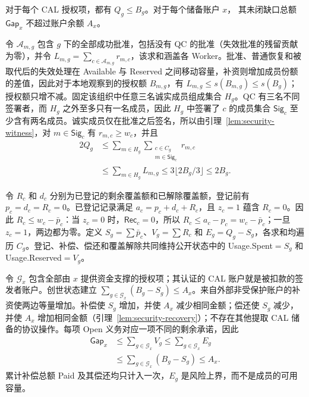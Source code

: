 \begin{theorem}[潜在责任具有资金覆盖]
\label{thm:security-coverage}
对于每个 CAL 授权项，都有 $Q_g\le B_g$。对于每个储备账户 $x$，
其未闭缺口总额 $\mathsf{Gap}_x$ 不超过账户余额 $A_x$。
\end{theorem}
\begin{IEEEproof}
令 $\mathcal A_{m,g}$ 包含 $g$ 下的全部成功批准，包括没有 QC 的批准（失效批准的残留贡献为零），并令 $L_{m,g}=\sum_{c\in\mathcal A_{m,g}}r_{m,c}$，该求和涵盖各 Worker。批准、普通恢复和被取代后的失效处理在 Available 与 Reserved 之间移动容量，补资则增加成员份额的差值，因此对于本地观察到的授权额 $B_{m,g}$，有 $L_{m,g}\le s(B_{m,g})\le s(B_g)$；授权额只增不减。固定该组织中任意三名诚实成员组成集合 $H_g$。QC 有三名不同签署者，而 $H_g$ 之外至多只有一名成员，因此 $H_g$ 中签署了 $c$ 的成员集合 $\mathsf{Sig}_c$ 至少含有两名成员。诚实成员仅在批准之后签名，所以由引理~\ref{lem:security-witness}，对 $m\in\mathsf{Sig}_c$ 有 $r_{m,c}\ge w_c$，并且
\begin{equation}
\begin{aligned}
  2Q_g
  &\le\sum_{m\in H_g}\sum_{\substack{c\in C_g\\m\in\mathsf{Sig}_c}}r_{m,c}\\
  &\le\sum_{m\in H_g}L_{m,g}
  \le3\lfloor2B_g/3\rfloor\le2B_g.
\end{aligned}
\label{eq:security-counting}
\end{equation}

令 $R_c$ 和 $d_c$ 分别为已登记的剩余覆盖额和已解除覆盖额，登记前有 $p_c=d_c=R_c=0$。已登记记录满足 $a_c=p_c+d_c+R_c$，且 $z_c=1$ 蕴含 $R_c=0$。因此 $R_c\le w_c-\bar p_c$：当 $z_c=0$ 时，$\mathsf{Rec}_c=0$，所以 $R_c\le a_c-p_c=w_c-\bar p_c$；一旦 $z_c=1$，两边都为零。定义 $S_g=\sum\bar p_c$、$V_g=\sum R_c$ 和 $E_g=Q_g-S_g$，各求和均遍历 $C_g$。登记、补偿、偿还和覆盖解除共同维持公开状态中的 Usage.Spent$=S_g$ 和 Usage.Reserved$=V_g$。

令 $\mathcal G_x$ 包含全部由 $x$ 提供资金支撑的授权项；其认证的 CAL 账户就是被扣款的签发者账户。创世状态建立 $\sum_{g\in\mathcal G_x}(B_g-S_g)\le A_x$。来自外部非受保护账户的补资使两边等量增加。补偿使 $S_g$ 增加，并使 $A_x$ 减少相同金额；偿还使 $S_g$ 减少，并使 $A_x$ 增加相同金额（引理~\ref{lem:security-recovery}）；不存在其他提取 CAL 储备的协议操作。每项 Open 义务对应一项不同的剩余承诺，因此
\begin{equation}
\begin{aligned}
\mathsf{Gap}_x&\le\sum_{g\in\mathcal G_x}V_g
    \le\sum_{g\in\mathcal G_x}E_g\\
   &\le\sum_{g\in\mathcal G_x}(B_g-S_g)\le A_x.
\end{aligned}
\label{eq:security-backing}
\end{equation}
累计补偿总额 Paid 及其偿还均只计入一次，$E_g$ 是风险上界，而不是成员的可用容量。
\end{IEEEproof}

